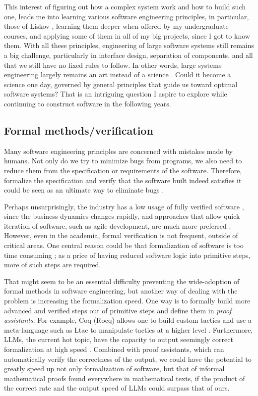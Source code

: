 \documentclass[10pt]{article}
\begin{document}
This interest of figuring out how a complex system work and how to build such
one, leads me into learning various software engineering principles, in
particular, those of Liskov \cite{liskov.adt, liskov.subtype}, learning them
deeper when offered by my undergraduate courses, and applying some of them in
all of my big projects, since I got to know them. With all these principles,
engineering of large software systems still remains a big challenge,
particularly in interface design, separation of components, and all that we
still have no fixed rules to follow. In other words, large systems engineering
largely remains an art instead of a science \cite{no.silver.bullet,
prospect.eng.discipline.software}. Could it become a science one day, governed
by general principles that guide us toward optimal software systems? That is an
intriguing question I aspire to explore while continuing to construct software
in the following years.

\subsection{Formal methods/verification}
Many software engineering principles are concerned with mistakes made by
humans. Not only do we try to minimize bugs from programs, we also
need to reduce them from the specification or requirements of the software.
Therefore, formalize the specification and verify that the software built
indeed satisfies it could be seen as an ultimate way to eliminate bugs
\cite{hoare.axiomatic.prog}. 

Perhaps unsurprisingly, the industry has a low usage of fully verified software
\cite{formal.methods.underuse}, since the business dynamics changes rapidly,
and approaches that allow quick iteration of software, such as agile
development, are much more preferred \cite{agile.se}. However, even in the
academia, formal verification is not frequent, outside of critical areas. One
central reason could be that formalization of software is too time consuming
\cite{formal.methods.underuse}; as a price of having reduced software logic
into primitive steps, more of such steps are required.

That might seem to be an essential difficulty preventing the wide-adoption of
formal methods in software engineering, but another way of dealing with the
problem is increasing the formalization speed. One way is to formally build
more advanced and verified steps out of primitive steps and define them in
\emph{proof assistants}. For example, Coq (Rocq) allows one to build custom
tactics and use a meta-language such as Ltac to manipulate tactics at a higher
level \cite{coq.manual}. Furthermore, LLMs, the current hot topic, have the
capacity to output seemingly correct formalization at high speed
\cite{llm.gen.proof}.  Combined with proof assistants, which can automatically
verify the correctness of the output, we could have the potential to greatly
speed up not only formalization of software, but that of informal mathematical
proofs found everywhere in mathematical texts, if the product of the correct
rate and the output speed of LLMs could surpass that of ours.
\end{document}
